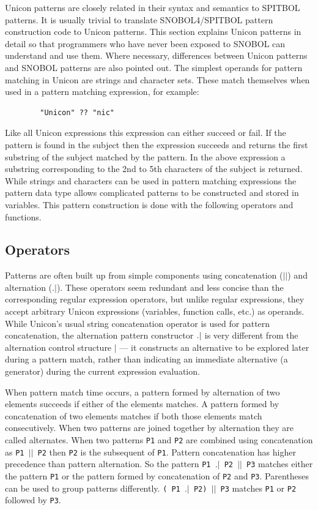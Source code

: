 \documentclass[letterpaper,12pt]{article}
\begin{document}
Unicon patterns are closely related in their syntax and semantics to
SPITBOL \cite{Dewar_McCann} patterns. It is usually trivial to translate
SNOBOL4/SPITBOL pattern construction code to Unicon patterns. This
section explains Unicon patterns in detail so that programmers who
have never been exposed to SNOBOL can understand and use them. Where
necessary, differences between Unicon patterns and SNOBOL patterns are
also pointed out.  The simplest operands for pattern matching in
Unicon are strings and character sets. These match themselves when
used in a pattern matching expression, for example:

\begin{verbatim}
        "Unicon" ?? "nic" 
\end{verbatim}

Like all Unicon expressions this expression can either succeed or
fail. If the pattern is found in the subject then the expression
succeeds and returns the first substring of the subject matched by the
pattern. In the above expression a substring corresponding to the 2nd
to 5th characters of the subject is returned. While strings and
characters can be used in pattern matching expressions the pattern
data type allows complicated patterns to be constructed and stored in
variables. This pattern construction is done with the following
operators and functions.

\subsection{Operators}

Patterns are often built up from simple components using concatenation
($||$) and alternation ($.|$). These operators seem redundant and less
concise than the corresponding regular expression operators, but
unlike regular expressions, they accept arbitrary Unicon expressions
(variables, function calls, etc.) as operands.  While Unicon's
usual string concatenation operator is used for pattern concatenation,
the alternation pattern constructor
${\tt .|}$ is very different from the alternation control structure $|$ ---
it constructs an alternative to be explored later during a
pattern match, rather than indicating an immediate alternative (a
generator) during the current expression evaluation.

When pattern match time occurs, a pattern formed
by alternation of two elements succeeds if either of the elements
matches. A pattern formed by concatenation of two elements matches if
both those elements match consecutively. When two patterns are joined
together by alternation they are called alternates. When two patterns
{\tt P1} and {\tt P2} are combined using concatenation as {\tt P1 $||$ P2}
then {\tt P2} is the subsequent of {\tt P1}. Pattern concatenation has
higher precedence than pattern alternation. So the pattern
{\tt P1 $.|$ P2 $||$ P3} matches either the pattern {\tt P1} or the
pattern formed by concatenation of {\tt P2} and
{\tt P3}. Parentheses can be used to group patterns differently.
{\tt ( P1 $.|$ P2) $||$ P3} matches {\tt P1} or {\tt P2} followed by
{\tt P3}.
\end{document}

